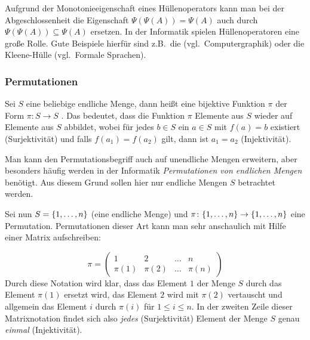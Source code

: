 Aufgrund der Monotonieeigenschaft eines Hüllenoperators kann man bei der Abgeschlossenheit die Eigenschaft $\Psi(\Psi(A)) = \Psi(A)$ auch durch $\Psi(\Psi(A)) \subseteq \Psi(A)$ ersetzen. In der Informatik spielen Hüllenoperatoren eine große Rolle. Gute Beispiele hierfür sind z.B.~die  (vgl.~Computergraphik) oder die Kleene-Hülle (vgl.~Formale Sprachen). 

\ifdiscretemath
%
%
\else

\subsubsection{Permutationen}
\label{Permutationen}
Sei $S$ eine beliebige endliche Menge, dann heißt eine bijektive Funktion $\pi$ der Form 
$\pi \colon S \rightarrow S$ \index{$\pi$}. Das bedeutet, dass die
Funktion $\pi$ Elemente aus $S$ wieder auf Elemente aus $S$ abbildet,
wobei für jedes $b \in S$ ein $a \in S$ mit $f(a) = b$ existiert
(Surjektivität) und falls $f(a_1) = f(a_2)$ gilt, dann ist $a_1 = a_2$
(Injektivität).

\begin{remark}
 Man kann den Permutationsbegriff auch auf unendliche Mengen erweitern, aber besonders häufig werden in der Informatik \emph{Permutationen von endlichen Mengen} benötigt. Aus diesem Grund sollen hier nur endliche Mengen $S$ betrachtet werden.
\end{remark}

Sei nun $S = \{1, \dots ,n\}$ (eine endliche Menge) und
$\pi \colon \{1, \dots ,n\} \rightarrow \{1, \dots ,n\}$ eine
Permutation. Permutationen dieser Art kann man sehr anschaulich mit
Hilfe einer Matrix aufschreiben:

\begin{displaymath}
\pi = \left( 
\begin{array}{cccc}
1 & 2 & \dots & n\\
\pi(1) & \pi(2) & \dots & \pi(n)
\end{array}
\right)
\end{displaymath}
Durch diese Notation wird klar, dass das Element $1$ der Menge $S$
durch das Element $\pi(1)$ ersetzt wird, das Element $2$ wird mit
$\pi(2)$ vertauscht und allgemein das Element $i$ durch $\pi(i)$ für
$1 \le i \le n$. In der zweiten Zeile dieser Matrixnotation findet
sich also \emph{jedes} (Surjektivität) Element der Menge $S$
genau \emph{einmal} (Injektivität).

